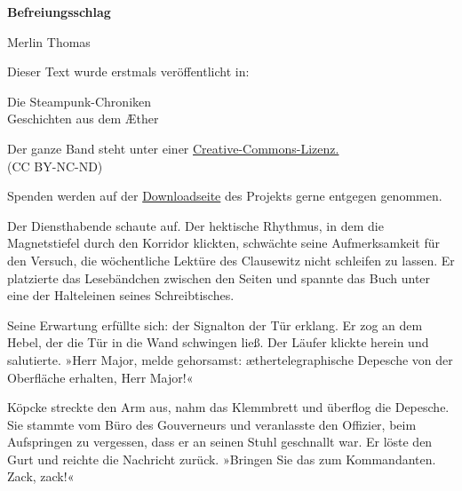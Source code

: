 \usepackage[ngerman]{babel}
\usepackage[T1]{fontenc}




\newcommand\bigpar\medskip


\raggedbottom
\begin{center}
\textbf{\huge\textsf{Befreiungsschlag}}

\medskip
Merlin Thomas

\end{center}

\bigskip
\begin{flushleft}
Dieser Text wurde erstmals veröffentlicht in:
\begin{center}
Die Steampunk-Chroniken\\
Geschichten aus dem Æther
\end{center}

\bigskip

Der ganze Band steht unter einer
\href{http://creativecommons.org/licenses/by-nc-nd/2.0/de/}{Creative-Commons-Lizenz.} \\
(CC BY-NC-ND)

\bigskip

Spenden werden auf der
\href{http://steampunk-chroniken.de/download}{Downloadseite}
des Projekts gerne entgegen genommen.
\end{flushleft}

\newpage

Der Diensthabende schaute auf. Der hektische Rhythmus, in dem die
Magnetstiefel durch den Korridor klickten, schwächte seine
Aufmerksamkeit für den Versuch, die wöchentliche Lektüre des
Clausewitz nicht schleifen zu lassen. Er platzierte das
Lesebändchen zwischen den Seiten und spannte das Buch unter eine
der Halteleinen seines Schreibtisches.

Seine Erwartung erfüllte sich: der Signalton der Tür erklang. Er
zog an dem Hebel, der die Tür in die Wand schwingen ließ. Der
Läufer klickte herein und salutierte. »Herr Major, melde
gehorsamst: æthertelegraphische Depesche von der Oberfläche
erhalten, Herr Major!«

Köpcke streckte den Arm aus, nahm das Klemmbrett und überflog die
Depesche. Sie stammte vom Büro des Gouverneurs und veranlasste den
Offizier, beim Aufspringen zu vergessen, dass er an seinen Stuhl
geschnallt war. Er löste den Gurt und reichte die Nachricht zurück.
»Bringen Sie das zum Kommandanten. Zack, zack!«

